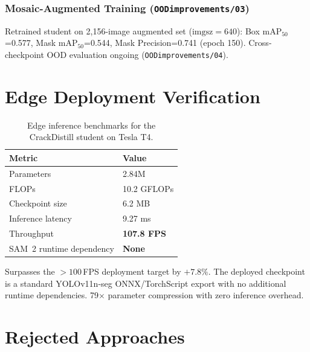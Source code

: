 \documentclass[12pt,a4paper]{article}
\begin{document}
\subsubsection{Mosaic-Augmented Training (\texttt{OODimprovements/03})}
Retrained student on 2,156-image augmented set ($\mathrm{imgsz}=640$):
Box mAP$_{50}$=0.577, Mask mAP$_{50}$=0.544, Mask Precision=0.741 (epoch 150).
Cross-checkpoint OOD evaluation ongoing (\texttt{OODimprovements/04}).

\section{Edge Deployment Verification}
\label{sec:edge}

\begin{table}[H]\centering
\caption{Edge inference benchmarks for the CrackDistill student on Tesla T4.}
\begin{tabular}{ll}
\toprule
Metric & Value \\
\midrule
Parameters & 2.84M \\
FLOPs & 10.2 GFLOPs \\
Checkpoint size & 6.2 MB \\
Inference latency & 9.27 ms \\
Throughput & \textbf{107.8 FPS} \\
SAM~2 runtime dependency & \textbf{None} \\
\bottomrule
\end{tabular}
\end{table}

Surpasses the $>100$\,FPS deployment target by $+7.8\%$.
The deployed checkpoint is a standard YOLOv11n-seg ONNX/TorchScript export
with no additional runtime dependencies.
79$\times$ parameter compression with zero inference overhead.

\section{Rejected Approaches}
\label{sec:rejected}
\end{document}
